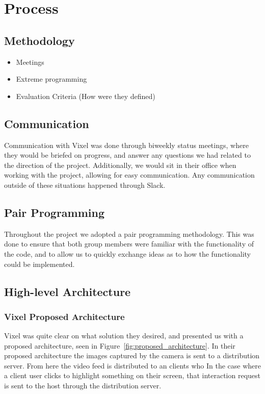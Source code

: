 \section{Process}
\subsection{Methodology}
\begin{itemize}
    \item Meetings
    \item Extreme programming
    \item Evaluation Criteria (How were they defined)
\end{itemize}

\subsection{Communication}
Communication with Vixel was done through biweekly status meetings, where they would be briefed on progress, and answer any questions we had related to the direction of the project. Additionally, we would sit in their office when working with the project, allowing for easy communication. Any communication outside of these situations happened through Slack.

\subsection{Pair Programming}
Throughout the project we adopted a pair programming methodology. This was done to ensure that both group members were familiar with the functionality of the code, and to allow us to quickly exchange ideas as to how the functionality could be implemented.

\subsection{High-level Architecture}
\subsubsection{Vixel Proposed Architecture}
Vixel was quite clear on what solution they desired, and presented us with a proposed architecture, seen in Figure~\ref{fig:proposed_architecture}. In their proposed architecture the images captured by the camera is sent to a distribution server. From here the video feed is distributed to an clients who 
In the case where a client user clicks to highlight something on their screen, that interaction request is sent to the host through the distribution server.


